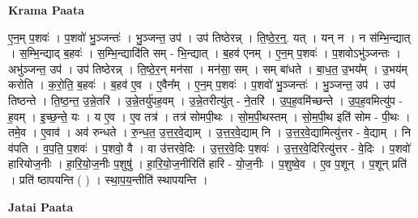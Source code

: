\documentclass[17pt]{extarticle}
\begin{document}
\textbf{Krama Paata} \newline

ए॒न॒म् प॒शवः॑ । प॒शवो॑ भु॒ञ्जन्तः॑ । भु॒ञ्जन्त॒ उप॑ । उप॑ तिष्ठेरन्न् । ति॒ष्ठे॒र॒न्॒. यत् । यन् न । न स॑म्भि॒न्द्यात् । स॒म्भि॒न्द्याद् ब॒हवः॑ । स॒म्भि॒न्द्यादि॑ति सम् - भि॒न्द्यात् । ब॒हव॑ एनम् । ए॒न॒म् प॒शवः॑ । प॒शवोऽभु॑ञ्जन्तः । अभु॑ञ्जन्त॒ उप॑ । उप॑ तिष्ठेरन्न् । ति॒ष्ठे॒र॒न् मन॑सा । मन॑सा॒ सम् । सम् बा॑धते । बा॒ध॒त॒ उ॒भय᳚म् । उ॒भय॑म् करोति । क॒रो॒ति॒ ब॒हवः॑ । ब॒हव॑ ए॒व । ए॒वैन᳚म् । ए॒न॒म् प॒शवः॑ । 
प॒शवो॑ भु॒ञ्जन्तः॑ । भु॒ञ्जन्त॒ उप॑ । उप॑ तिष्ठन्ते । ति॒ष्ठ॒न्त॒ उ॒न्ने॒तरि॑ । उ॒न्ने॒तर्यु॑पह॒वम् । उ॒न्ने॒तरीत्यु॑त् - ने॒तरि॑ । उ॒प॒ह॒वमि॑च्छन्ते । उ॒प॒ह॒वमित्यु॑प - ह॒वम् । इ॒च्छ॒न्ते॒ यः । य ए॒व । ए॒व तत्र॑ । तत्र॑ सोमपी॒थः । सो॒म॒पी॒थस्तम् । सो॒म॒पी॒थ इति॑ सोम - पी॒थः । तमे॒व । ए॒वाव॑ । अव॑ रुन्धते । रु॒न्ध॒त॒ उ॒त्त॒र॒वे॒द्याम् । उ॒त्त॒र॒वे॒द्याम् नि । उ॒त्त॒र॒वे॒द्यामित्यु॑त्तर - वे॒द्याम् । नि व॑पति । व॒प॒ति॒ प॒शवः॑ । प॒शवो॒ वै । वा उ॑त्तरवे॒दिः । उ॒त्त॒र॒वे॒दिः प॒शवः॑ । उ॒त्त॒र॒वे॒दिरित्यु॑त्तर - वे॒दिः । प॒शवो॑ हारियोज॒नीः । हा॒रि॒यो॒ज॒नीः प॒शुषु॑ । हा॒रि॒यो॒ज॒नीरिति॑ हारि - यो॒ज॒नीः । प॒शुष्वे॒व । ए॒व प॒शून् । प॒शून् प्रति॑ । प्रति॑ ष्ठापयन्ति ( ) । स्था॒प॒य॒न्तीति॑ स्थापयन्ति । \newline

\textbf{Jatai Paata} \newline
\end{document}
